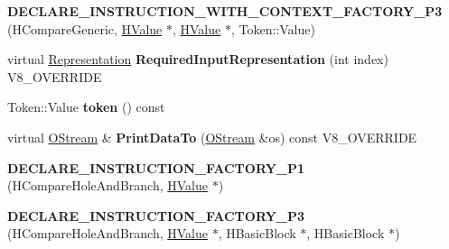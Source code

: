 \begin{DoxyCompactItemize}
\item 
\hypertarget{classv8_1_1internal_1_1_v8___f_i_n_a_l_a26a8321dfa4585f02604ece53d1c671b}{}{\bfseries D\+E\+C\+L\+A\+R\+E\+\_\+\+I\+N\+S\+T\+R\+U\+C\+T\+I\+O\+N\+\_\+\+W\+I\+T\+H\+\_\+\+C\+O\+N\+T\+E\+X\+T\+\_\+\+F\+A\+C\+T\+O\+R\+Y\+\_\+\+P3} (H\+Compare\+Generic, \hyperlink{classv8_1_1internal_1_1_h_value}{H\+Value} $\ast$, \hyperlink{classv8_1_1internal_1_1_h_value}{H\+Value} $\ast$, Token\+::\+Value)\label{classv8_1_1internal_1_1_v8___f_i_n_a_l_a26a8321dfa4585f02604ece53d1c671b}

\item 
\hypertarget{classv8_1_1internal_1_1_v8___f_i_n_a_l_a6c6d1f37f40b113d8f4062f1ffff7215}{}virtual \hyperlink{classv8_1_1internal_1_1_representation}{Representation} {\bfseries Required\+Input\+Representation} (int index) V8\+\_\+\+O\+V\+E\+R\+R\+I\+D\+E\label{classv8_1_1internal_1_1_v8___f_i_n_a_l_a6c6d1f37f40b113d8f4062f1ffff7215}

\item 
\hypertarget{classv8_1_1internal_1_1_v8___f_i_n_a_l_aa0dbe4d92fe80d26cd12fa922142f392}{}Token\+::\+Value {\bfseries token} () const \label{classv8_1_1internal_1_1_v8___f_i_n_a_l_aa0dbe4d92fe80d26cd12fa922142f392}

\item 
\hypertarget{classv8_1_1internal_1_1_v8___f_i_n_a_l_ac450dad970b14246be761ccf5004924b}{}virtual \hyperlink{classv8_1_1internal_1_1_o_stream}{O\+Stream} \& {\bfseries Print\+Data\+To} (\hyperlink{classv8_1_1internal_1_1_o_stream}{O\+Stream} \&os) const V8\+\_\+\+O\+V\+E\+R\+R\+I\+D\+E\label{classv8_1_1internal_1_1_v8___f_i_n_a_l_ac450dad970b14246be761ccf5004924b}

\item 
\hypertarget{classv8_1_1internal_1_1_v8___f_i_n_a_l_a88a1158045b046bbf568ecceb9e96c11}{}{\bfseries D\+E\+C\+L\+A\+R\+E\+\_\+\+I\+N\+S\+T\+R\+U\+C\+T\+I\+O\+N\+\_\+\+F\+A\+C\+T\+O\+R\+Y\+\_\+\+P1} (H\+Compare\+Hole\+And\+Branch, \hyperlink{classv8_1_1internal_1_1_h_value}{H\+Value} $\ast$)\label{classv8_1_1internal_1_1_v8___f_i_n_a_l_a88a1158045b046bbf568ecceb9e96c11}

\item 
\hypertarget{classv8_1_1internal_1_1_v8___f_i_n_a_l_a051770834309c396cef25f2cec00a4fc}{}{\bfseries D\+E\+C\+L\+A\+R\+E\+\_\+\+I\+N\+S\+T\+R\+U\+C\+T\+I\+O\+N\+\_\+\+F\+A\+C\+T\+O\+R\+Y\+\_\+\+P3} (H\+Compare\+Hole\+And\+Branch, \hyperlink{classv8_1_1internal_1_1_h_value}{H\+Value} $\ast$, H\+Basic\+Block $\ast$, H\+Basic\+Block $\ast$)\label{classv8_1_1internal_1_1_v8___f_i_n_a_l_a051770834309c396cef25f2cec00a4fc}


\end{DoxyCompactItemize}
